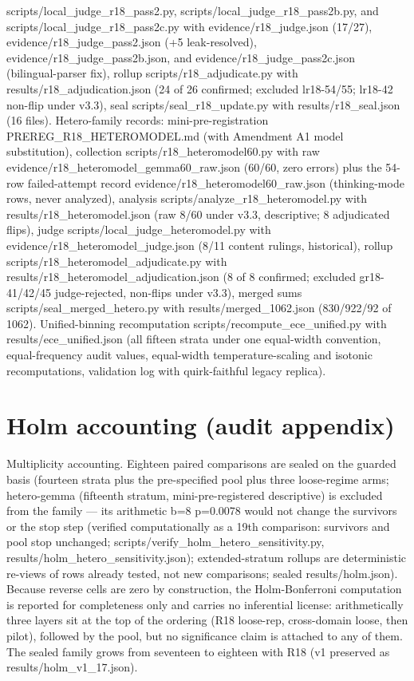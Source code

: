 \documentclass[10pt]{article} %
\begin{document}
scripts/local\_judge\_r18\_pass2.py, scripts/local\_judge\_r18\_pass2b.py, and scripts/local\_judge\_r18\_pass2c.py with evidence/r18\_judge.json (17/27), evidence/r18\_judge\_pass2.json (+5 leak-resolved), evidence/r18\_judge\_pass2b.json, and evidence/r18\_judge\_pass2c.json (bilingual-parser fix), rollup scripts/r18\_adjudicate.py with results/r18\_adjudication.json (24 of 26 confirmed; excluded lr18-54/55; lr18-42 non-flip under v3.3), seal scripts/seal\_r18\_update.py with results/r18\_seal.json (16 files). Hetero-family records: mini-pre-registration PREREG\_R18\_HETEROMODEL.md (with Amendment A1 model substitution), collection scripts/r18\_heteromodel60.py with raw evidence/r18\_heteromodel\_gemma60\_raw.json (60/60, zero errors) plus the 54-row failed-attempt record evidence/r18\_heteromodel60\_raw.json (thinking-mode rows, never analyzed), analysis scripts/analyze\_r18\_heteromodel.py with results/r18\_heteromodel.json (raw 8/60 under v3.3, descriptive; 8 adjudicated flips), judge scripts/local\_judge\_heteromodel.py with evidence/r18\_heteromodel\_judge.json (8/11 content rulings, historical), rollup scripts/r18\_heteromodel\_adjudicate.py with results/r18\_heteromodel\_adjudication.json (8 of 8 confirmed; excluded gr18-41/42/45 judge-rejected, non-flips under v3.3), merged sums scripts/seal\_merged\_hetero.py with results/merged\_1062.json (830/922/92 of 1062). Unified-binning recomputation scripts/recompute\_ece\_unified.py with results/ece\_unified.json (all fifteen strata under one equal-width convention, equal-frequency audit values, equal-width temperature-scaling and isotonic recomputations, validation log with quirk-faithful legacy replica).

\section{Holm accounting (audit appendix)}
Multiplicity accounting. Eighteen paired comparisons are sealed on the guarded basis (fourteen strata plus the pre-specified pool plus three loose-regime arms; hetero-gemma (fifteenth stratum, mini-pre-registered descriptive) is excluded from the family --- its arithmetic b=8 p=0.0078 would not change the survivors or the stop step (verified computationally as a 19th comparison: survivors and pool stop unchanged; scripts/verify\_holm\_hetero\_sensitivity.py, results/holm\_hetero\_sensitivity.json); extended-stratum rollups are deterministic re-views of rows already tested, not new comparisons; sealed results/holm.json). Because reverse cells are zero by construction, the Holm-Bonferroni computation is reported for completeness only and carries no inferential license: arithmetically three layers sit at the top of the ordering (R18 loose-rep, cross-domain loose, then pilot), followed by the pool, but no significance claim is attached to any of them. The sealed family grows from seventeen to eighteen with R18 (v1 preserved as results/holm\_v1\_17.json).
\end{document}
